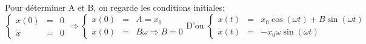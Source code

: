 	Pour déterminer A et B, on regarde les conditions initiales:
	\[\left\{\begin{array}{rcl}
				x(0) &=& 0 \\
				\dot{x} &=& 0
		\end{array}\right.
	\Rightarrow 
	\left\{\begin{array}{rcl}
		x(0) &=& A = x_0 \\
		\dot{x}(0) &=& B\omega \Rightarrow B=0\end{array}\right.
			\text{D'ou } \left\{
			\begin{array}{rcl}
				x(t) &=& x_0\cos(\omega t) + B\sin(\omega t) \\
		\dot{x}(t) &=& -x_0\omega\sin(\omega t) \end{array}\right.\]
